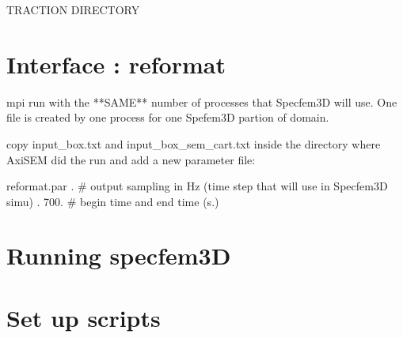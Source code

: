 \documentclass[a4paper,11pt]{article}
\begin{document}
TRACTION DIRECTORY \newline




\section{Interface : reformat}

mpi run with the **SAME** number of processes that Specfem3D will use. One
file is created by one process for one Spefem3D partion of domain. \newline

copy input\_box.txt and input\_box\_sem\_cart.txt inside the directory where
AxiSEM did the run and add a new parameter file: \newline

reformat.par  .         \# output sampling in Hz (time step that will use in Specfem3D simu) . 700.   \# begin time and end time (s.) \newline


\section{Running specfem3D}


\section{Set up scripts}
\end{document}
